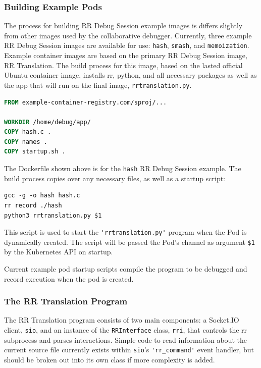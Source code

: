 \documentclass[12pt]{article}
\begin{document}
\subsubsection{Building Example Pods} \label{buildingchannel}

The process for building RR Debug Session example images is differs
slightly from other images used by the collaborative debugger.
Currently, three example RR Debug Session images are available for
use: \lstinline{hash}, \lstinline{smash}, and \lstinline{memoization}.
Example container images are based on the primary RR Debug Session
image, RR Translation.  The build process for this image, based on the
lasted official Ubuntu container image, installs rr, python, and all
necessary packages as well as the app that will run on the final
image, \lstinline{rrtranslation.py}.

\begin{lstlisting}[language=Dockerfile,basicstyle=\linespread{0.5}\ttfamily,caption={RR Debug Session Hash Example---Dockerfile},captionpos=b]
FROM example-container-registry.com/sproj/...
  
WORKDIR /home/debug/app/
COPY hash.c .
COPY names .
COPY startup.sh .
\end{lstlisting}

The Dockerfile shown above is for the \lstinline{hash} RR Debug
Session example.  The build process copies over any necessary files,
as well as a startup script:

\begin{lstlisting}[basicstyle=\linespread{0.5}\ttfamily,caption={Example Startup Script},captionpos=b]
gcc -g -o hash hash.c
rr record ./hash
python3 rrtranslation.py $1
\end{lstlisting}

This script is used to start the \lstinline{'rrtranslation.py'} program
when the Pod is dynamically created.  The script will be passed the
Pod's channel as argument \lstinline{$1} by the Kubernetes API on
startup.
\par

Current example pod startup scripts compile the program to be debugged
and record execution when the pod is created.

\subsubsection{The RR Translation Program} \label{joiningchannel}

The RR Translation program consists of two main components: a
Socket.IO client, \lstinline{sio}, and an instance of the
\lstinline{RRInterface} class, \lstinline{rri}, that controls the rr
subprocess and parses interactions.  Simple code to read information
about the current source file currently exists within
\lstinline{sio}'s \lstinline{'rr_command'} event handler, but should
be broken out into its own class if more complexity is added.
\par
\end{document}
